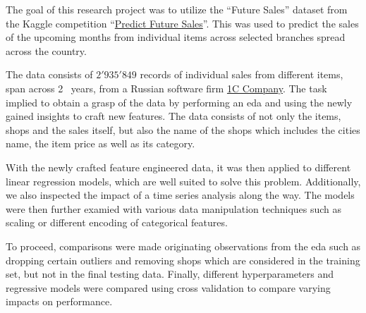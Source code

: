 The goal of this research project was to utilize the \enquote{Future Sales} dataset from the Kaggle competition \enquote{\href{https://www.kaggle.com/c/competitive-data-science-predict-future-sales}{Predict Future Sales}}.
This was used to predict the sales of the upcoming months from individual items across selected branches spread across the country.

The data consists of $2'935'849$ records of individual sales from different items, span across 2 \textonehalf \ years, from a Russian software firm \href{https://1c.ru/eng/title.htm}{1C Company}.
The task implied to obtain a grasp of the data by performing an \acrfull{eda} and using the newly gained insights to craft new features.
The data consists of not only the items, shops and the sales itself, but also the name of the shops which includes the cities name, the item price as well as its category.

With the newly crafted feature engineered data, it was then applied to different linear regression models, which are well suited to solve this problem.
Additionally, we also inspected the impact of a time series analysis along the way.
The models were then further examied with various data manipulation techniques such as scaling or different encoding of categorical features.

To proceed, comparisons were made originating observations from the \acrshort{eda} such as dropping certain outliers and removing shops which are considered in the training set, but not in the final testing data.
Finally, different hyperparameters and regressive models were compared using cross validation to compare varying impacts on performance.
